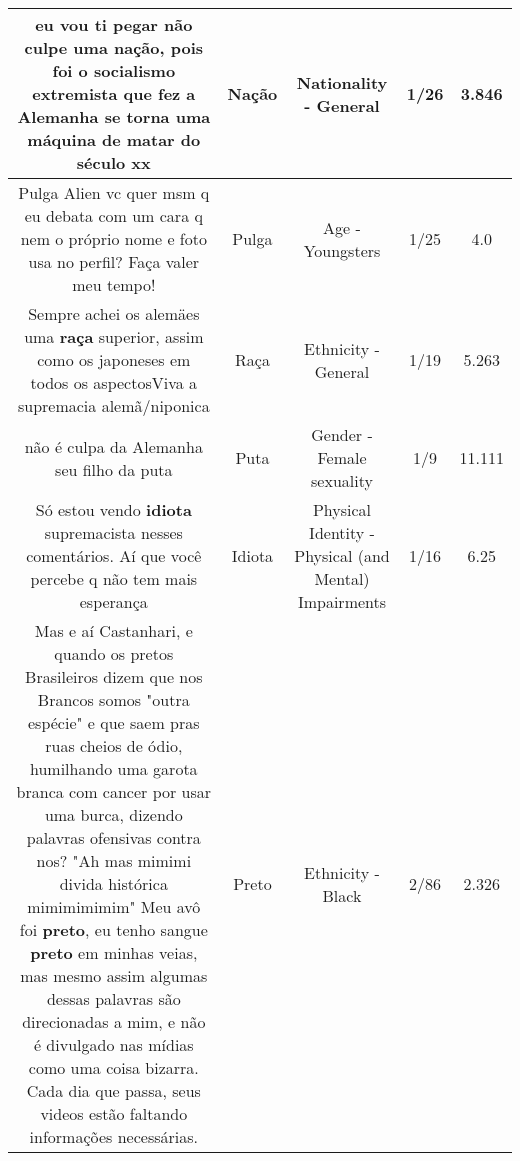 \documentclass[11pt]{article}
\newlength\mylength
\begin{document}
\begin{center}
\begin{longtable}{|C{.65\mylength}|C{.30\mylength}|C{.12\mylength}|C{.12\mylength}|C{.12\mylength}|}
  \small eu vou ti pegar não culpe uma \textbf{nação}, pois foi o socialismo extremista que fez a Alemanha se torna uma máquina de matar do século xx\normalsize   & Nação & Nationality - General & 1/26 & 3.846 \\  \hline
  \small Pulga Alien vc quer msm q eu debata com um cara q nem o próprio nome e foto usa no perfil? Faça valer meu tempo!\normalsize   & Pulga & Age - Youngsters & 1/25 & 4.0 \\  \hline
  \small Sempre achei os alemäes uma \textbf{raça} superior, assim como os japoneses em todos os aspectosViva a supremacia alemã/niponica\normalsize   & Raça & Ethnicity - General & 1/19 & 5.263 \\  \hline
  \small não é culpa da Alemanha seu filho da puta\normalsize   & Puta & Gender - Female sexuality & 1/9 & 11.111 \\  \hline
  \small Só estou vendo \textbf{idiota} supremacista nesses comentários. Aí que você percebe q não tem mais esperança\normalsize   & Idiota & Physical Identity - Physical (and Mental) Impairments & 1/16 & 6.25 \\  \hline
  \small Mas e aí Castanhari, e quando os pretos Brasileiros dizem que nos Brancos somos "outra espécie" e que saem pras ruas cheios de ódio, humilhando uma garota branca com cancer por usar uma burca, dizendo palavras ofensivas contra nos? "Ah mas mimimi divida histórica mimimimimim" Meu avô foi \textbf{preto}, eu tenho sangue \textbf{preto} em minhas veias, mas mesmo assim algumas dessas palavras são direcionadas a mim, e não é divulgado nas mídias como uma coisa bizarra. Cada dia que passa, seus videos estão faltando informações necessárias.\normalsize   & Preto & Ethnicity - Black & 2/86 & 2.326 \\  \hline

\end{longtable}
\end{center}
\end{document}
